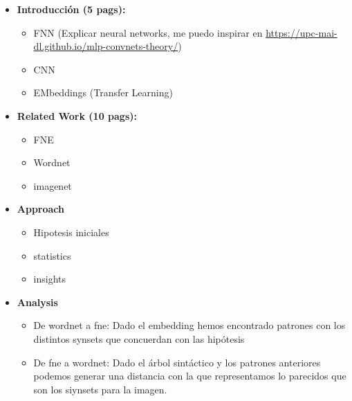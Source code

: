 \documentclass[12,twoside]{TFG-GM}
\theoremstyle{definition}
\theoremstyle{remark}
\begin{document}
\begin{itemize}
\item \textbf{Introducción (5 pags): }
\begin{itemize}
\item FNN (Explicar neural networks, me puedo inspirar en \url{https://upc-mai-dl.github.io/mlp-convnets-theory/})
\item CNN 
\item EMbeddings  (Transfer Learning)
\end{itemize}
\item \textbf{Related Work (10 pags):}
\begin{itemize}
\item FNE 
\item Wordnet 
\item imagenet 
\end{itemize}
\item \textbf{Approach }
\begin{itemize}
\item Hipotesis iniciales 
\item statistics 
\item insights 
\end{itemize}
\item \textbf{Analysis}
\begin{itemize}
\item De wordnet a fne: Dado el embedding hemos encontrado patrones con los distintos synsets que concuerdan con las hipótesis
\item De fne a wordnet: Dado el árbol sintáctico y los patrones anteriores podemos generar una distancia con la que representamos lo parecidos que son los siynsets para la imagen. 
\end{itemize}
\end{itemize}

\newpage




\appendix
\vfill\newpage 
\end{document}
